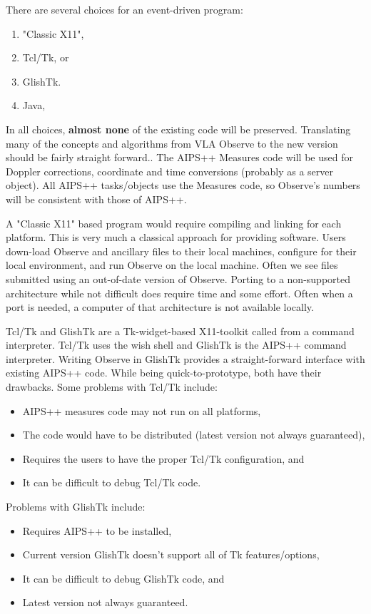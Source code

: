 There are several choices for an event-driven program:
\begin{enumerate}
\item "Classic X11",
\item Tcl/Tk, or
\item GlishTk.
\item Java,
\end{enumerate}

In all choices, \textbf{almost none} of the existing code will be preserved. 
Translating many of
the concepts and algorithms from VLA Observe to the new version should be
fairly straight forward..
The AIPS++ Measures code will be used for Doppler corrections, coordinate and
time conversions (probably as a server object).
All AIPS++ tasks/objects use the Measures code, so Observe's numbers will be
consistent with those of AIPS++.

A "Classic X11" based program would require compiling and linking for each
platform. 
This is very much a classical approach for providing software.  Users down-load
Observe and ancillary files to their local machines, configure for their local
environment,  and run Observe
on the local machine.
Often we see files submitted using an out-of-date version of Observe.
Porting to a non-supported architecture while not difficult does require time
and some effort.  Often when a port is needed, a computer of that architecture
is not available locally.

Tcl/Tk and GlishTk are a Tk-widget-based X11-toolkit called from a
command interpreter.  
Tcl/Tk uses the wish shell and GlishTk is the AIPS++ command
interpreter.  Writing Observe in GlishTk provides a straight-forward interface
with existing AIPS++ code. While being quick-to-prototype,
both have their drawbacks.
Some problems with Tcl/Tk include:
\begin{itemize}
\item AIPS++ measures code may not run on all platforms,
\item The code would have to be distributed (latest version not always
guaranteed),
\item Requires the users to have the proper Tcl/Tk configuration, and
\item It can be difficult to debug Tcl/Tk code.
\end{itemize} 

Problems with GlishTk include:
\begin{itemize}
\item Requires AIPS++ to be installed,
\item Current version GlishTk doesn't support all of Tk features/options,
\item It can be difficult to debug GlishTk code, and
\item Latest version not always guaranteed.
\end{itemize}

